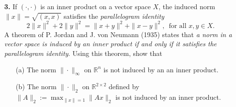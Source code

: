 \documentclass[10pt]{report}
\begin{document}
\begin{enumerate}
\item[\textbf{3.}] If $(\cdot,\cdot)$ is an inner product on a vector  space $X$, the induced norm $\|x\|= \sqrt{(x, x)}$ satisfies the \textit{parallelogram identity}
\[2 \|x\|^2 + 2\|y\|^2 = \|x+y\|^2 + \|x-y\|^2, \, \text{ for all } x,y \in X.\]
A theorem of P. Jordan and J. von Neumann (1935) states that \textit{a norm in a vector space is induced by an inner product if and only if it satisfies the parallelogram identity}. Using this theorem, show that
\begin{enumerate}
  \item[(a)] The norm $\|\cdot\|_{\infty}$ on $\mathbb{R}^n$ is not induced by an an inner product.
  \item[(b)] The norm $\|\cdot\|_{2}$ on $\mathbb{R}^{2\times 2}$ defined by $\|A\|_2:= \max_{\|x\|=1}\|Ax\|_2$ is not induced by an inner product.
\end{enumerate}













\end{enumerate}
\end{document}
